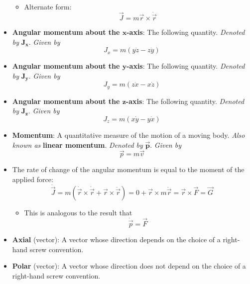 \documentclass[../notes.tex]{subfiles}
\begin{document}
\begin{itemize}
    \begin{itemize}
        \item Alternate form:
        \begin{equation*}
            \vec{J} = m\vec{r}\times\dot{\vec{r}}
        \end{equation*}
    \end{itemize}
    \item \textbf{Angular momentum about the $\bm{x}$-axis}: The following quantity. \emph{Denoted by} $\bm{J_x}$. \emph{Given by}
    \begin{equation*}
        J_x = m(y\dot{z}-z\dot{y})
    \end{equation*}
    \item \textbf{Angular momentum about the $\bm{y}$-axis}: The following quantity. \emph{Denoted by} $\bm{J_y}$. \emph{Given by}
    \begin{equation*}
        J_y = m(z\dot{x}-x\dot{z})
    \end{equation*}
    \item \textbf{Angular momentum about the $\bm{z}$-axis}: The following quantity. \emph{Denoted by} $\bm{J_z}$. \emph{Given by}
    \begin{equation*}
        J_z = m(x\dot{y}-y\dot{x})
    \end{equation*}
    \item \textbf{Momentum}: A quantitative measure of the motion of a moving body. \emph{Also known as} \textbf{linear momentum}. \emph{Denoted by} $\bm{\vec{p}}$. \emph{Given by}
    \begin{equation*}
        \vec{p} = m\vec{v}
    \end{equation*}
    \item The rate of change of the angular momentum is equal to the moment of the applied force:
    \begin{equation*}
        \dot{\vec{J}} = m(\dot{\vec{r}}\times\dot{\vec{r}}+\vec{r}\times\ddot{\vec{r}})
        = 0+\vec{r}\times m\ddot{\vec{r}}
        = \vec{r}\times\vec{F}
        = \vec{G}
    \end{equation*}
    \begin{itemize}
        \item This is analogous to the result that
        \begin{equation*}
            \dot{\vec{p}} = \vec{F}
        \end{equation*}
    \end{itemize}
    \item \textbf{Axial} (vector): A vector whose direction depends on the choice of a right-hand screw convention.
    \item \textbf{Polar} (vector): A vector whose direction does not depend on the choice of a right-hand screw convention.
\end{itemize}
\end{document}
